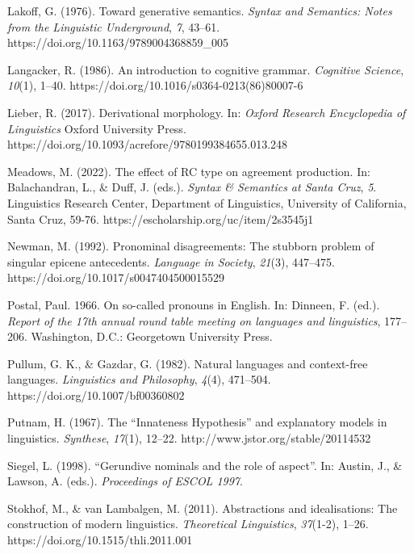 \documentclass{article}
\begin{document}
\begin{thebibliography}{100}
     Lakoff, G. (1976). Toward generative semantics. \textit{Syntax and Semantics: Notes from the Linguistic Underground}, \textit{7}, 43–61. https://doi.org/10.1163/9789004368859\_005
    
    Langacker, R. (1986). An introduction to cognitive grammar. \textit{Cognitive Science}, \textit{10}(1), 1–40. https://doi.org/10.1016/s0364-0213(86)80007-6
    
    Lieber, R. (2017). Derivational morphology. In: \textit{Oxford Research Encyclopedia of Linguistics} Oxford University Press. https://doi.org/10.1093/acrefore/9780199384655.013.248

     Meadows, M. (2022). The effect of RC type on agreement production. In: Balachandran, L., \& Duff, J. (eds.). \textit{Syntax \& Semantics at Santa Cruz}, \textit{5}. Linguistics Research Center, Department of Linguistics, University of California, Santa Cruz, 59-76. https://escholarship.org/uc/item/2s3545j1
    
     Newman, M. (1992). Pronominal disagreements: The stubborn problem of singular epicene antecedents. \textit{Language in Society}, \textit{21}(3), 447–475. https://doi.org/10.1017/s0047404500015529
    
    Postal, Paul. 1966. On so-called pronouns in English. In: Dinneen, F. (ed.). \textit{Report of the 17th annual round table meeting on languages and linguistics}, 177–206. Washington, D.C.: Georgetown University Press.

    Pullum, G. K., \& Gazdar, G. (1982). Natural languages and context-free languages. \textit{Linguistics and Philosophy}, \textit{4}(4), 471–504. https://doi.org/10.1007/bf00360802

    Putnam, H. (1967). The “Innateness Hypothesis” and explanatory models in linguistics. \textit{Synthese}, \textit{17}(1), 12–22. http://www.jstor.org/stable/20114532
    
     Siegel, L. (1998). “Gerundive nominals and the role of aspect”. In: Austin, J., \& Lawson, A. (eds.). \textit{Proceedings of ESCOL 1997}.
    
    Stokhof, M., \& van Lambalgen, M. (2011). Abstractions and idealisations: The construction of modern linguistics. \textit{Theoretical Linguistics}, \textit{37}(1-2), 1–26. https://doi.org/10.1515/thli.2011.001


\end{thebibliography}
\end{document}
